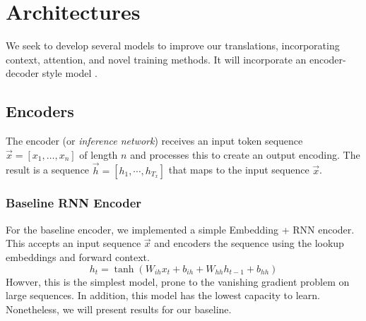 \documentclass[twoside,twocolumn]{article}
\begin{document}

\section{Architectures}
\label{sec:architecture}
We seek to develop several models to improve our translations, incorporating
context, attention, and novel training methods. It will
incorporate an encoder-decoder style model \cite{cho2014learning}
\cite{sutskever2014sequence}.

\subsection{Encoders}
The encoder (or \emph{inference network}) receives an input token sequence
$\vec{x} = \left[{x_1,\hdots, x_n}\right]$ of length $n$ and processes
this to create an output encoding. The result is a sequence
$\vec{h} = \left[{h_1, \cdots, h_{T_x}}\right]$ that
maps to the input sequence $\vec{x}$.
\subsubsection{Baseline RNN Encoder}
For the baseline encoder, we implemented a simple Embedding + RNN encoder.
This accepts an input sequence $\vec{x}$ and encoders the sequence using the lookup
embeddings and forward context.
\begin{equation}
  \label{eq:rnn}
  h_t = \tanh(W_{ih} x_t + b_{ih}  +  W_{hh} h_{t-1} + b_{hh})
\end{equation}
Howver, this is the simplest model, prone to the vanishing gradient problem
on large sequences. In addition, this model has the lowest capacity to learn.
Nonetheless, we will present results for our baseline.
\end{document}
